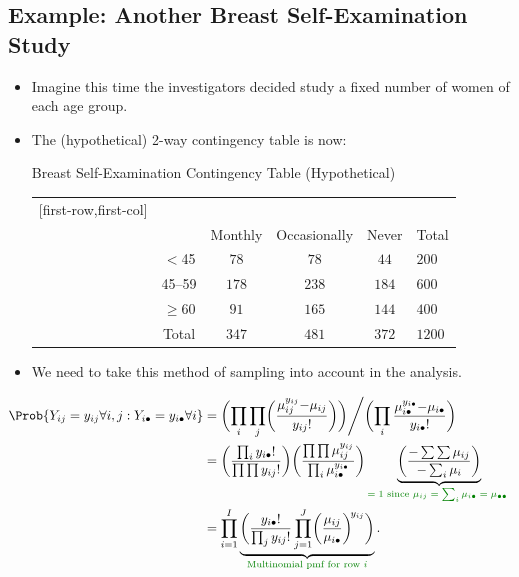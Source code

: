 \documentclass{article}\usepackage[]{graphicx}\usepackage[svgnames]{xcolor}
\providecommand\given{} %
\renewcommand\given{\nonscript\:\delimsize\vert\nonscript\:\mathopen{}}%
\renewcommand\given{\nonscript\:\delimsize\vert\nonscript\:\mathopen{}}%
\renewcommand\given{\nonscript\:\delimsize\vert\nonscript\:\mathopen{}}%
\renewcommand\given{\nonscript\:\delimsize\vert\nonscript\:\mathopen{}}%
\renewcommand\given{\nonscript\:\delimsize\vert\nonscript\:\mathopen{}}%
\renewcommand\given{\nonscript\:\delimsize\vert\nonscript\:\mathopen{}}%
\renewcommand\given{\nonscript\:\delimsize\vert\nonscript\:\mathopen{}}%
\renewcommand\given{\nonscript\:\delimsize\vert\nonscript\:\mathopen{}}%
\let\exp\relax%
\renewcommand\given{:}
\begin{document}
\subsection*{Example: Another Breast Self-Examination Study}
\begin{itemize}
      \item Imagine this time the investigators decided study a fixed number of women of
            each age group.
      \item The (hypothetical) 2-way contingency table is now:
            \begin{Example}{Breast Self-Examination Contingency Table (Hypothetical)}
                  \begin{center}
                        \begin{NiceTabular}{c|ccc|c}[first-row,first-col]
                              &&\\
                              && Monthly & Occasionally & Never & Total\\
                              \midrule
                               & $<$45 & $ 78 $ & $ 78 $ & $ 44 $ & $ 200 $\\
                              & 45--59 & $ 178 $ & $ 238 $ & $ 184 $ & $ 600 $\\
                              & $ \ge $60 & $ 91 $ & $ 165 $ & $ 144 $ & $ 400 $\\
                              \midrule
                              & Total & $ 347 $ & $ 481 $ & $ 372 $ & $ 1200 $
                        \end{NiceTabular}
                  \end{center}
            \end{Example}
      \item We need to take this method of sampling into account in the analysis.
\end{itemize}
\begin{align*}
      \Prob{Y_{ij}=y_{ij}\forall i,j\given Y_{i\bullet}=y_{i\bullet}\forall i}
       & =\biggl(\prod_i \prod_j \biggl(\frac{\mu_{ij}^{y_{ij}} \exp{-\mu_{ij}}}{y_{ij}!}\biggr)\biggr)\Bigg/\biggl(\prod_i \frac{\mu_{i\bullet}^{y_{i\bullet}}\exp{-\mu_{i\bullet}}}{y_{i\bullet}!}\biggr)             \\
       & =\biggl(\frac{\prod_i y_{i\bullet}!}{\prod\prod y_{ij}!}\biggr)\biggl(\frac{\prod\prod \mu_{ij}^{y_{ij}}}{\prod_i \mu_{i\bullet}^{y_{i\bullet}}}\biggr)
      \underbrace{\biggl(\frac{\exp{-\sum\sum \mu_{ij}}}{\exp{-\sum_i \mu_i}}\biggr)}_{\textcolor{Green}{\text{$=1$ since $\mu_{i j}=\sum_i \mu_{i\bullet}=\mu_{\bullet\bullet}$ }}}                                    \\
       & =\prod_{i=1}^I \underbrace{\biggl(\frac{y_{i\bullet}!}{\prod_j y_{ij}!}\prod_{j=1}^J \biggl(\frac{\mu_{ij}}{\mu_{i\bullet}}\biggr)^{\!y_{ij}}\biggr)}_{\textcolor{Green}{\text{Multinomial pmf for row $i$}}}.
\end{align*}
\end{document}
